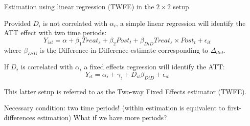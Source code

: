 \documentclass[notes,11pt, aspectratio=169]{beamer}
\newenvironment{wideitemize}{\itemize\addtolength{\itemsep}{10pt}}{\enditemize}
\begin{document}
\begin{frame}{Estimation using linear regression (TWFE) in the $2\times 2$ setup}
  \begin{wideitemize}
  \item Provided $D_{i}$ is not correlated with $\alpha_{i}$, a simple linear regression will identify the ATT effect with two time periods:
  \begin{equation}
  Y_{ist} = \alpha + \beta_1 Treat_s + \beta_2 Post_t + \beta_{DiD} Treat_s \times Post_t + \epsilon_{it}
  \end{equation}
  where $\beta_{DiD}$ is the Difference-in-Difference estimate corresponding to $\Delta_{did}$. 
  \item If $D_{i}$ is correlated with $\alpha_{i}$ a fixed effects regression will identify the ATT: 
  \begin{equation}
  Y_{it} = \alpha_{i}+ \gamma_{t} + D_{it}\beta_{DiD} + \epsilon_{it}
  \end{equation}
  \item This latter setup is referred to as the Two-way Fixed Effects estimator (TWFE). 
  \item Necessary condition: two time periods! (within estimation is equivalent to first-differences estimation) What if we have more periods?
  \end{wideitemize}
\end{frame}
\end{document}
